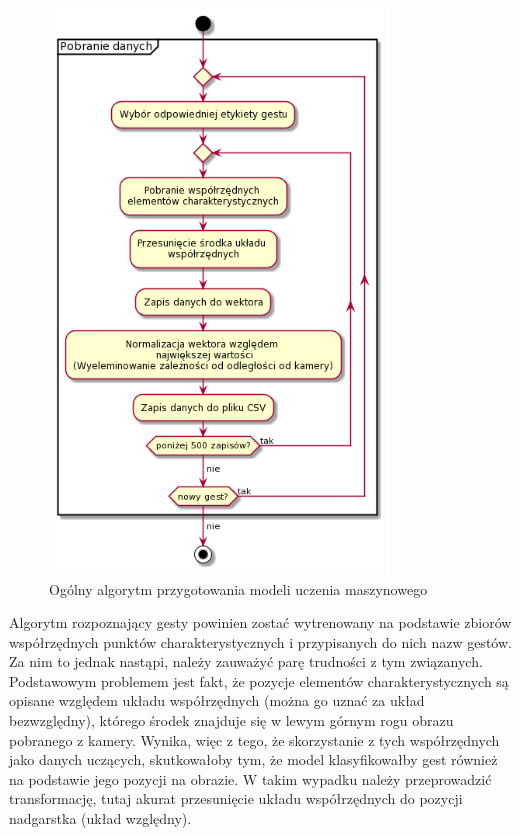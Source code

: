 \begin{figure}
    \begin{center}
        \includegraphics[width=9cm]{../images/get_data.png}
        \caption{Ogólny algorytm przygotowania modeli uczenia maszynowego}
    \end{center}
\end{figure}


\quad Algorytm rozpoznający gesty powinien zostać wytrenowany na podstawie zbiorów współrzędnych punktów charakterystycznych i przypisanych do nich nazw gestów. Za nim to jednak nastąpi, należy zauważyć parę trudności z tym związanych. Podstawowym problemem jest fakt, że pozycje elementów charakterystycznych są opisane względem układu współrzędnych (można go uznać za układ bezwzględny), którego środek znajduje się w lewym górnym rogu obrazu pobranego z kamery. Wynika, więc z tego, że skorzystanie z tych współrzędnych jako danych uczących, skutkowałoby tym, że model klasyfikowałby gest również na podstawie jego pozycji na obrazie. W takim wypadku należy przeprowadzić transformację, tutaj akurat przesunięcie układu współrzędnych do pozycji nadgarstka (układ względny). \newpage

